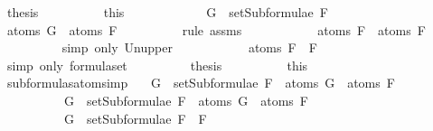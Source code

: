 \begin{isabellebody}
\ {\isacharquery}thesis\isanewline
\ \ \ \ \ \ \ \ \isamarkupfalse%
\ this\isanewline
\ \ \ \ \isamarkupfalse%
\isanewline
\ \ \ \ \ \ \isamarkupfalse%
\ {\isachardoublequoteopen}G\ {\isasymin}\ setSubformulae\ F{}{\isachardoublequoteclose}\isanewline
\ \ \ \ \ \ \isamarkupfalse%
\ \isamarkupfalse%
\ {\isachardoublequoteopen}atoms\ G\ {\isasymsubseteq}\ atoms\ F{}{\isachardoublequoteclose}\isanewline
\ \ \ \ \ \ \ \ \isamarkupfalse%
\ {\isacharparenleft}rule\ assms{\isacharparenleft}{}{\isacharparenright}{\isacharparenright}\isanewline
\ \ \ \ \ \ \isamarkupfalse%
\ \isamarkupfalse%
\ {\isachardoublequoteopen}{\isasymdots}\ {\isasymsubseteq}\ atoms\ F{}\ {\isasymunion}\ atoms\ F{}{\isachardoublequoteclose}\isanewline
\ \ \ \ \ \ \ \ \isamarkupfalse%
\ {\isacharparenleft}simp\ only{\isacharcolon}\ Un{\isacharunderscore}upper{}{\isacharparenright}\isanewline
\ \ \ \ \ \ \isamarkupfalse%
\ \isamarkupfalse%
\ {\isachardoublequoteopen}{\isasymdots}\ {\isacharequal}\ atoms\ {\isacharparenleft}F{}\ \isactrlbold {\isasymor}\ F{}{\isacharparenright}{\isachardoublequoteclose}\isanewline
\ \ \ \ \ \ \ \ \isamarkupfalse%
\ {\isacharparenleft}simp\ only{\isacharcolon}\ formula{\isachardot}set{\isacharparenleft}{}{\isacharparenright}{\isacharparenright}\isanewline
\ \ \ \ \ \ \isamarkupfalse%
\ \isamarkupfalse%
\ {\isacharquery}thesis\isanewline
\ \ \ \ \ \ \ \ \isamarkupfalse%
\ this\isanewline
\ \ \ \ \isamarkupfalse%
\isanewline
\ \ \isamarkupfalse%
\isanewline
{}\isamarkupfalse%
%
\endisatagproof
{\isafoldproof}%
%
\isadelimproof
\isanewline
%
\endisadelimproof
\isanewline
{}\isamarkupfalse%
\ subformulas{\isacharunderscore}atoms{\isacharunderscore}imp{\isacharcolon}\isanewline
\ \ \ {\isachardoublequoteopen}G\ {\isasymin}\ setSubformulae\ F{}\ {\isasymLongrightarrow}\ atoms\ G\ {\isasymsubseteq}\ atoms\ F{}{\isachardoublequoteclose}\isanewline
\ \ \ \ \ \ \ \ \ \ {\isachardoublequoteopen}G\ {\isasymin}\ setSubformulae\ F{}\ {\isasymLongrightarrow}\ atoms\ G\ {\isasymsubseteq}\ atoms\ F{}{\isachardoublequoteclose}\isanewline
\ \ \ \ \ \ \ \ \ \ {\isachardoublequoteopen}G\ {\isasymin}\ setSubformulae\ {\isacharparenleft}F{}\ \isactrlbold {\isasymrightarrow}\ F{}{\isacharparenright}{\isachardoublequoteclose}\isanewline

\end{isabellebody}
